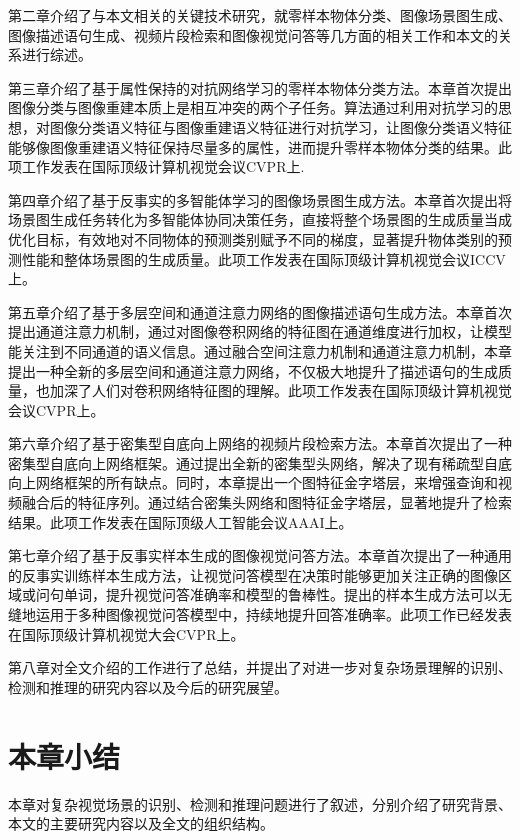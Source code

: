 \begin{asparaitem}

\item 第二章介绍了与本文相关的关键技术研究，就零样本物体分类、图像场景图生成、图像描述语句生成、视频片段检索和图像视觉问答等几方面的相关工作和本文的关系进行综述。

\item 第三章介绍了基于属性保持的对抗网络学习的零样本物体分类方法。本章首次提出图像分类与图像重建本质上是相互冲突的两个子任务。算法通过利用对抗学习的思想，对图像分类语义特征与图像重建语义特征进行对抗学习，让图像分类语义特征能够像图像重建语义特征保持尽量多的属性，进而提升零样本物体分类的结果。此项工作发表在国际顶级计算机视觉会议CVPR上.

\item 第四章介绍了基于反事实的多智能体学习的图像场景图生成方法。本章首次提出将场景图生成任务转化为多智能体协同决策任务，直接将整个场景图的生成质量当成优化目标，有效地对不同物体的预测类别赋予不同的梯度，显著提升物体类别的预测性能和整体场景图的生成质量。此项工作发表在国际顶级计算机视觉会议ICCV上。


\item 第五章介绍了基于多层空间和通道注意力网络的图像描述语句生成方法。本章首次提出通道注意力机制，通过对图像卷积网络的特征图在通道维度进行加权，让模型能关注到不同通道的语义信息。通过融合空间注意力机制和通道注意力机制，本章提出一种全新的多层空间和通道注意力网络，不仅极大地提升了描述语句的生成质量，也加深了人们对卷积网络特征图的理解。此项工作发表在国际顶级计算机视觉会议CVPR上。


\item 第六章介绍了基于密集型自底向上网络的视频片段检索方法。本章首次提出了一种密集型自底向上网络框架。通过提出全新的密集型头网络，解决了现有稀疏型自底向上网络框架的所有缺点。同时，本章提出一个图特征金字塔层，来增强查询和视频融合后的特征序列。通过结合密集头网络和图特征金字塔层，显著地提升了检索结果。此项工作发表在国际顶级人工智能会议AAAI上。


\item 第七章介绍了基于反事实样本生成的图像视觉问答方法。本章首次提出了一种通用的反事实训练样本生成方法，让视觉问答模型在决策时能够更加关注正确的图像区域或问句单词，提升视觉问答准确率和模型的鲁棒性。提出的样本生成方法可以无缝地运用于多种图像视觉问答模型中，持续地提升回答准确率。此项工作已经发表在国际顶级计算机视觉大会CVPR上。


\item 第八章对全文介绍的工作进行了总结，并提出了对进一步对复杂场景理解的识别、检测和推理的研究内容以及今后的研究展望。

\end{asparaitem}


\section{本章小结}
本章对复杂视觉场景的识别、检测和推理问题进行了叙述，分别介绍了研究背景、本文的主要研究内容以及全文的组织结构。

